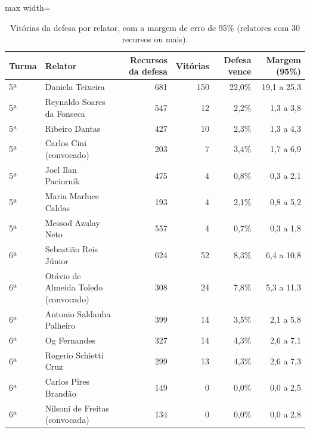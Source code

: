 \begin{table}[h]
\centering\small
\caption{Vitórias da defesa por relator, com a margem de erro de 95\% (relatores com 30 recursos ou mais).}
\label{tab:dados-relator}
\begin{adjustbox}{max width=\textwidth}
\begin{tabular}{llrrrr}
\toprule
Turma & Relator & Recursos da defesa & Vitórias & Defesa vence & Margem (95\%) \\
\midrule
5ª & Daniela Teixeira & 681 & 150 & 22,0\% & 19,1 a 25,3 \\
5ª & Reynaldo Soares da Fonseca & 547 & 12 & 2,2\% & 1,3 a 3,8 \\
5ª & Ribeiro Dantas & 427 & 10 & 2,3\% & 1,3 a 4,3 \\
5ª & Carlos Cini (convocado) & 203 & 7 & 3,4\% & 1,7 a 6,9 \\
5ª & Joel Ilan Paciornik & 475 & 4 & 0,8\% & 0,3 a 2,1 \\
5ª & Maria Marluce Caldas & 193 & 4 & 2,1\% & 0,8 a 5,2 \\
5ª & Messod Azulay Neto & 557 & 4 & 0,7\% & 0,3 a 1,8 \\
\midrule
6ª & Sebastião Reis Júnior & 624 & 52 & 8,3\% & 6,4 a 10,8 \\
6ª & Otávio de Almeida Toledo (convocado) & 308 & 24 & 7,8\% & 5,3 a 11,3 \\
6ª & Antonio Saldanha Palheiro & 399 & 14 & 3,5\% & 2,1 a 5,8 \\
6ª & Og Fernandes & 327 & 14 & 4,3\% & 2,6 a 7,1 \\
6ª & Rogerio Schietti Cruz & 299 & 13 & 4,3\% & 2,6 a 7,3 \\
6ª & Carlos Pires Brandão & 149 & 0 & 0,0\% & 0,0 a 2,5 \\
6ª & Nilsoni de Freitas (convocada) & 134 & 0 & 0,0\% & 0,0 a 2,8 \\
\bottomrule
\end{tabular}
\end{adjustbox}
\end{table}
